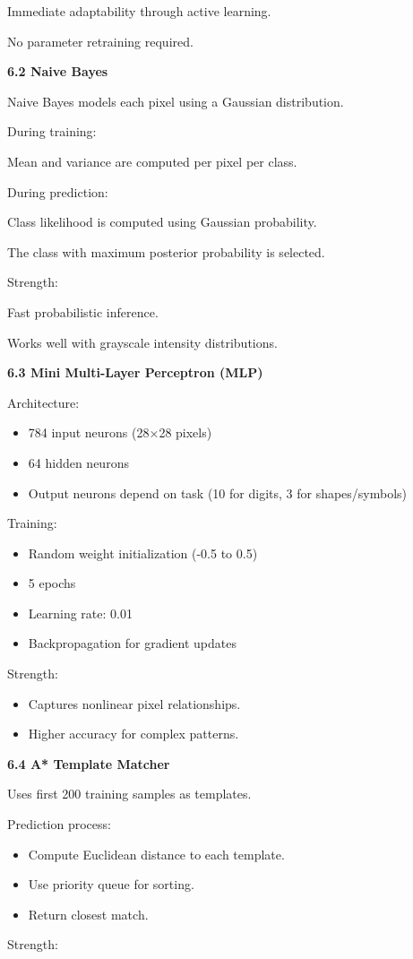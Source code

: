 \documentclass[9pt,a4paper]{extarticle}
\newcommand{\Sub}[1]{\vspace{2pt}\noindent\textbf{#1}\par\vspace{1pt}}
\begin{document}
Immediate adaptability through active learning.

No parameter retraining required.

\Sub{6.2 Naive Bayes}
Naive Bayes models each pixel using a Gaussian distribution.

During training:
\newpage

Mean and variance are computed per pixel per class.

During prediction:

Class likelihood is computed using Gaussian probability.

The class with maximum posterior probability is selected.

Strength:

Fast probabilistic inference.

Works well with grayscale intensity distributions.

\Sub{6.3 Mini Multi-Layer Perceptron (MLP)}
Architecture:
\begin{itemize}
\item 784 input neurons (28×28 pixels)
\item 64 hidden neurons
\item Output neurons depend on task (10 for digits, 3 for shapes/symbols)
\end{itemize}
Training:
\begin{itemize}
\item Random weight initialization (-0.5 to 0.5)
\item 5 epochs
\item Learning rate: 0.01
\item Backpropagation for gradient updates
\end{itemize}
Strength:
\begin{itemize}
\item Captures nonlinear pixel relationships.
\item Higher accuracy for complex patterns.
\end{itemize}

\Sub{6.4 A* Template Matcher}
Uses first 200 training samples as templates.

Prediction process:
\begin{itemize}
\item Compute Euclidean distance to each template.
\item Use priority queue for sorting.
\item Return closest match.
\end{itemize}
Strength:
\end{document}
